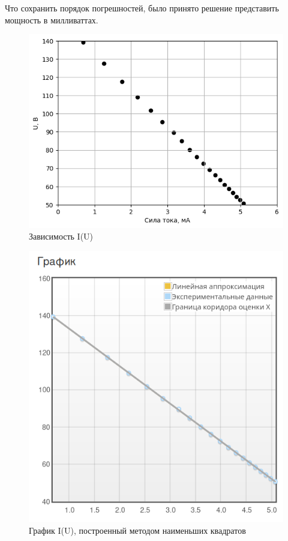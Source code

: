 \documentclass[a4paper,12pt]{article}
\begin{document}
Что сохранить порядок погрешностей, было принято решение представить мощность в милливаттах.

\begin{figure}[ht!]
    \centering
    \includegraphics[scale=0.7]{3_2.png}

        \caption{Зависимость I(U)}
\end{figure}

\newpage
\begin{figure}[ht!]
    \centering
    \includegraphics[scale=0.7]{MNK_1.png}
    \caption{График I(U), построенный методом наименьших квадратов}
\end{figure}
\end{document}
